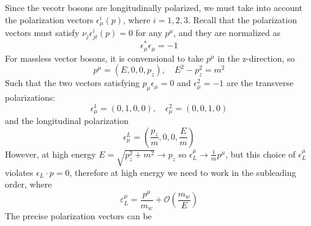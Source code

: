 \documentclass[11pt]{article}
\begin{document}
{Since the vecotr bosons are longitudinally polarized, we must take into account the polarization vectors $\epsilon_\mu^i (p)$, where $i=1,2,3$. Recall that the polarization vectors must satisfy $\nu_{j} \epsilon_{j t}^{i}(p)=0 $ for any $p^\mu$, and they are normalized as
\begin{equation}
    \epsilon_{\mu}^{*} \epsilon_{\mu}=-1
\end{equation}
For massless vector bosons, it is convensional to take $p^\mu$ in the z-direction, so 
\begin{equation}
    p^{\mu}=\left(E, 0,0, p_{z}\right), \quad E^{2}-p_{z}^{2}=m^{2}
\end{equation}
Such that the two vectors satisfying $p_{\mu} \epsilon_{\mu}=0$ and $\epsilon_{\mu}^{2}=-1$ are the transverse polarizations:
\begin{equation}
    \epsilon_{\mu}^{1}=(0,1,0,0), \quad \epsilon_{\mu}^{2}=(0,0,1,0)
\end{equation}
and the longitudinal polarization 
\begin{equation}
    \epsilon_{\mu}^{L}=\left(\frac{p_{z}}{m}, 0,0, \frac{E}{m}\right)
\end{equation}
However, at high energy $E=\sqrt{p_{z}^{2}+m^{2}} \rightarrow p_{z}$ so $\epsilon_{L}^{\mu} \rightarrow \frac{1}{m} p^{\mu}$, but this choice of $\epsilon_{L}^{\mu}$ violates  $\epsilon_{L} \cdot p=0$, therefore at high energy we need to work in the subleading order, where 
\begin{equation}
    \varepsilon_{L}^{\mu}=\frac{p^{\mu}}{m_{w}}+\mathcal{O}\left(\frac{m_{w}}{E}\right)
\end{equation}
The precise polarization vectors can be

}
\end{document}
